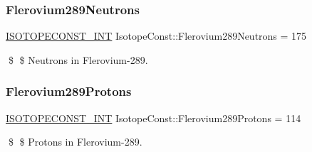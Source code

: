 \subsubsection{\texorpdfstring{Flerovium289\+Neutrons}{Flerovium289Neutrons}}
{\footnotesize\ttfamily \mbox{\hyperlink{group___isotope_const-_macros_ga5f18360b3e99483a35c32d789e62621c}{I\+S\+O\+T\+O\+P\+E\+C\+O\+N\+S\+T\+\_\+\+I\+NT}} Isotope\+Const\+::\+Flerovium289\+Neutrons = 175}

\$ \$ Neutrons in Flerovium-\/289. \mbox{\label{group___isotope_const-_flerovium-_fl289_ga6a59b7ae078c34845968a4b09039408a}} 
\subsubsection{\texorpdfstring{Flerovium289\+Protons}{Flerovium289Protons}}
{\footnotesize\ttfamily \mbox{\hyperlink{group___isotope_const-_macros_ga5f18360b3e99483a35c32d789e62621c}{I\+S\+O\+T\+O\+P\+E\+C\+O\+N\+S\+T\+\_\+\+I\+NT}} Isotope\+Const\+::\+Flerovium289\+Protons = 114}

\$ \$ Protons in Flerovium-\/289. 